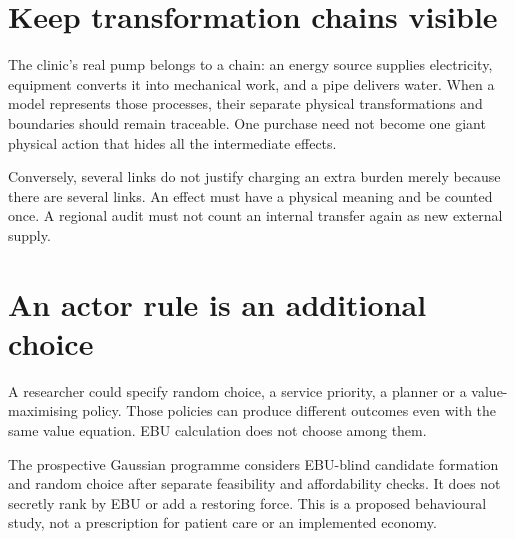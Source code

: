 \section{Keep transformation chains visible}
The clinic's real pump belongs to a chain: an energy source supplies electricity, equipment converts it into mechanical work, and a pipe delivers water. When a model represents those processes, their separate physical transformations and boundaries should remain traceable. One purchase need not become one giant physical action that hides all the intermediate effects.

Conversely, several links do not justify charging an extra burden merely because there are several links. An effect must have a physical meaning and be counted once. A regional audit must not count an internal transfer again as new external supply.

\section{An actor rule is an additional choice}
A researcher could specify random choice, a service priority, a planner or a value-maximising policy. Those policies can produce different outcomes even with the same value equation. EBU calculation does not choose among them.

The prospective Gaussian programme considers EBU-blind candidate formation and random choice after separate feasibility and affordability checks. It does not secretly rank by EBU or add a restoring force. This is a proposed behavioural study, not a prescription for patient care or an implemented economy.



